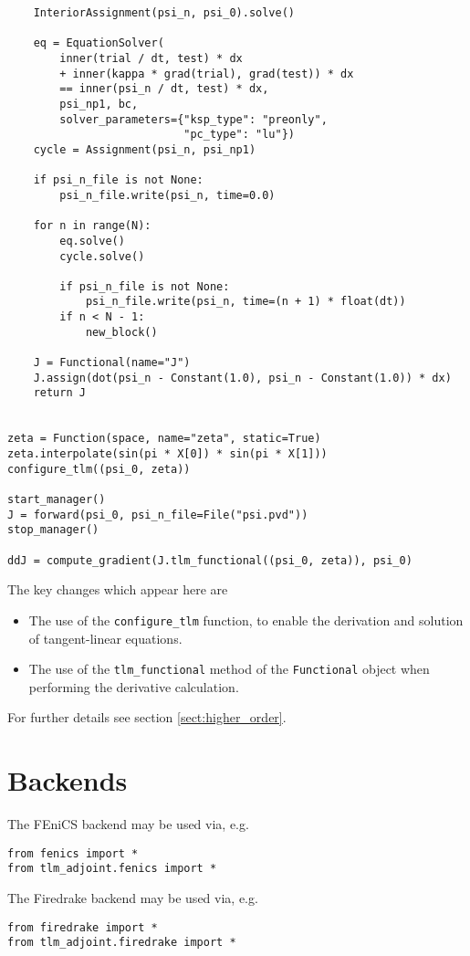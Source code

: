 \documentclass[11pt]{article}
\begin{document}
\begin{lstlisting}
    InteriorAssignment(psi_n, psi_0).solve()

    eq = EquationSolver(
        inner(trial / dt, test) * dx
        + inner(kappa * grad(trial), grad(test)) * dx
        == inner(psi_n / dt, test) * dx,
        psi_np1, bc,
        solver_parameters={"ksp_type": "preonly",
                           "pc_type": "lu"})
    cycle = Assignment(psi_n, psi_np1)

    if psi_n_file is not None:
        psi_n_file.write(psi_n, time=0.0)

    for n in range(N):
        eq.solve()
        cycle.solve()

        if psi_n_file is not None:
            psi_n_file.write(psi_n, time=(n + 1) * float(dt))
        if n < N - 1:
            new_block()

    J = Functional(name="J")
    J.assign(dot(psi_n - Constant(1.0), psi_n - Constant(1.0)) * dx)
    return J


zeta = Function(space, name="zeta", static=True)
zeta.interpolate(sin(pi * X[0]) * sin(pi * X[1]))
configure_tlm((psi_0, zeta))

start_manager()
J = forward(psi_0, psi_n_file=File("psi.pvd"))
stop_manager()

ddJ = compute_gradient(J.tlm_functional((psi_0, zeta)), psi_0)
\end{lstlisting}

The key changes which appear here are
\begin{itemize}
  \item The use of the \texttt{configure\_tlm} function, to enable the
    derivation and solution of tangent-linear equations. 
  \item The use of the \texttt{tlm\_functional} method of the
    \texttt{Functional} object when performing the derivative calculation.
\end{itemize}
For further details see section \ref{sect:higher_order}.

\section{Backends}\label{sect:backends}

The FEniCS backend may be used via, e.g.
\begin{lstlisting}
from fenics import *
from tlm_adjoint.fenics import *
\end{lstlisting}

The Firedrake backend may be used via, e.g.
\begin{lstlisting}
from firedrake import *
from tlm_adjoint.firedrake import *
\end{lstlisting}
\end{document}
